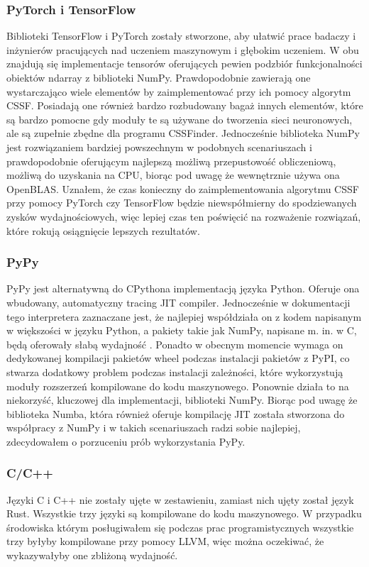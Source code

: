 \documentclass[11pt, a4paper]{article}
\begin{document}
\begin{sloppypar}
    \subsubsection{PyTorch i TensorFlow}
    Biblioteki TensorFlow i PyTorch zostały stworzone, aby ułatwić prace badaczy i inżynierów
    pracujących nad uczeniem maszynowym i głębokim uczeniem. W obu znajdują się
    implementacje tensorów oferujących pewien podzbiór funkcjonalności obiektów ndarray
    z biblioteki NumPy. Prawdopodobnie zawierają one wystarczająco wiele elementów by zaimplementować
    przy ich pomocy algorytm CSSF. Posiadają one również bardzo rozbudowany bagaż innych
    elementów, które są bardzo pomocne gdy moduły te są używane do tworzenia sieci neuronowych,
    ale są zupełnie zbędne dla programu CSSFinder. Jednocześnie biblioteka NumPy jest rozwiązaniem
    bardziej powszechnym w podobnych scenariuszach i prawdopodobnie oferującym najlepszą
    możliwą przepustowość obliczeniową, możliwą do uzyskania na CPU, biorąc pod uwagę że
    wewnętrznie używa ona OpenBLAS. Uznałem, że czas konieczny do zaimplementowania algorytmu
    CSSF przy pomocy PyTorch czy TensorFlow będzie niewspółmierny do spodziewanych zysków
    wydajnościowych, więc lepiej czas ten poświęcić na rozważenie rozwiązań, które rokują
    osiągnięcie lepszych rezultatów.

    \subsubsection{PyPy}
    PyPy jest alternatywną do CPythona implementacją języka Python. Oferuje ona
    wbudowany, automatyczny tracing JIT compiler. Jednocześnie w dokumentacji tego
    interpretera zaznaczane jest, że najlepiej współdziała on z kodem napisanym w większości
    w języku Python, a pakiety takie jak NumPy, napisane m. in. w C, będą oferowały
    słabą wydajność \cite{PyPyPerformance}. Ponadto w obecnym momencie wymaga on dedykowanej
    kompilacji pakietów wheel podczas instalacji pakietów z PyPI, co stwarza dodatkowy
    problem podczas instalacji zależności, które wykorzystują moduły rozszerzeń kompilowane
    do kodu maszynowego. Ponownie działa to na niekorzyść, kluczowej dla implementacji,
    biblioteki NumPy. Biorąc pod uwagę że biblioteka Numba, która również oferuje
    kompilację JIT została stworzona do współpracy z NumPy i w takich scenariuszach
    radzi sobie najlepiej, zdecydowałem o porzuceniu prób wykorzystania PyPy.

    \subsubsection{C/C++}
    Języki C i C++ nie zostały ujęte w zestawieniu, zamiast nich ujęty został język Rust.
    Wszystkie trzy języki są kompilowane do kodu maszynowego. W przypadku środowiska
    którym posługiwałem się podczas prac programistycznych wszystkie trzy byłyby
    kompilowane przy pomocy LLVM, więc można oczekiwać, że wykazywałyby one zbliżoną
    wydajność.


\end{sloppypar}
\end{document}
